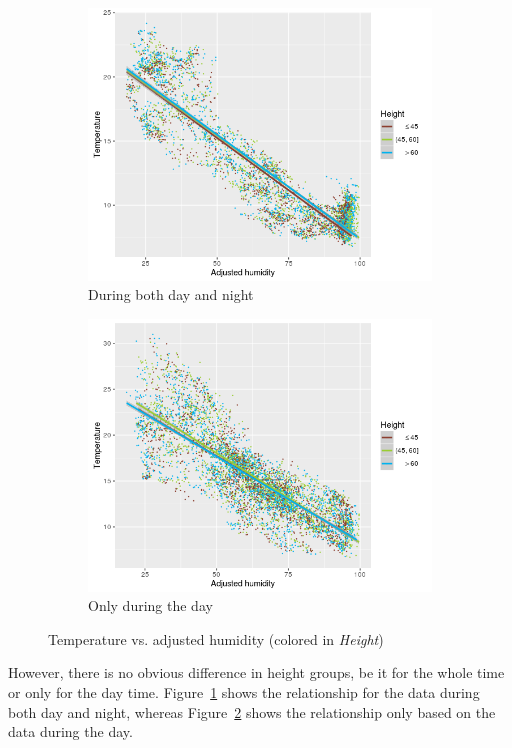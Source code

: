\documentclass[11pt]{article}
\begin{document}
\begin{figure}[!htb]
\centering
\begin{subfigure}{.5\textwidth}
  \centering
  \includegraphics[width=.9\linewidth]{../figures/tempHumidHeightall.png}
  \caption{During both day and night}
  \label{fig:thhall}
\end{subfigure}%
\begin{subfigure}{.5\textwidth}
  \centering
  \includegraphics[width=.9\linewidth]{../figures/tempHumidHeightday.png}
  \caption{Only during the day}
  \label{fig:thhsample}
\end{subfigure}
\caption{Temperature vs. adjusted humidity (colored in \textit{Height})}
\label{fig:tempHumidAllDay}
\end{figure}
However, there is no obvious difference in height groups, be it for the whole time or only for the day time. Figure~\ref{fig:thhall} shows the relationship for the data during both day and night, whereas Figure~\ref{fig:thhsample} shows the relationship only based on the data during the day.
\end{document}
